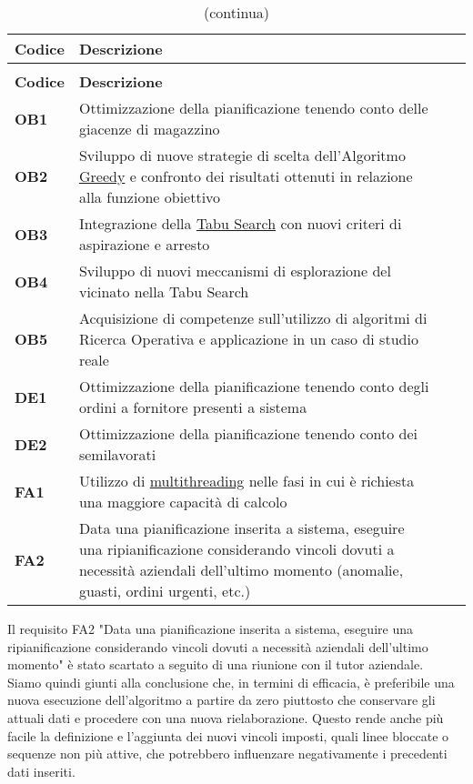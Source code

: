 \renewcommand{\arraystretch}{1.5}
\begin{longtable}{ 
		>{\centering}p{} 
		>{\raggedright}p{}
		>{\raggedright}p{} 
		>{\centering}p{}
	}
	
	\caption{Tabella degli obiettivi del piano di lavoro}\\
	\rowcolorhead
	\textbf{Codice} & \centering{}\textbf{Descrizione}
	\tabularnewline
	\endfirsthead
	\rowcolor{white}\caption[]{(continua)}\\
	\rowcolorhead
	\textbf{Codice} & \centering{}\textbf{Descrizione}
	
	\tabularnewline
	\endhead
	
	\rowcolordark \textbf{OB1} & Ottimizzazione della pianificazione tenendo conto delle giacenze di magazzino 
	\tabularnewline
	\rowcolorlight \textbf{OB2} & Sviluppo di nuove strategie di scelta dell’Algoritmo \hyperref[Greedy]{Greedy\glo} e confronto dei risultati ottenuti in relazione alla funzione obiettivo
	\tabularnewline
	\rowcolordark \textbf{OB3} & Integrazione della \hyperref[Tabu Search]{Tabu Search\glo} con nuovi criteri di aspirazione e arresto
	\tabularnewline
	\rowcolorlight \textbf{OB4} & Sviluppo di nuovi meccanismi di esplorazione del vicinato nella Tabu Search
	\tabularnewline
	\rowcolordark \textbf{OB5} & Acquisizione di competenze sull’utilizzo di algoritmi di Ricerca Operativa e applicazione in un caso di studio reale
	\tabularnewline
	\rowcolorlight \textbf{DE1} & Ottimizzazione della pianificazione tenendo conto degli ordini a fornitore presenti a sistema
	\tabularnewline
	\rowcolordark \textbf{DE2} & Ottimizzazione della pianificazione tenendo conto dei semilavorati
	\tabularnewline
	\rowcolorlight \textbf{FA1} & Utilizzo di \hyperref[Multithreading]{multithreading\glo} nelle fasi in cui è richiesta una maggiore capacità di calcolo
	\tabularnewline
	\rowcolordark \textbf{FA2} & Data una pianificazione inserita a sistema, eseguire una ripianificazione considerando vincoli dovuti a necessità aziendali dell’ultimo momento (anomalie, guasti, ordini urgenti, etc.)
	\tabularnewline
	
\end{longtable}


Il requisito FA2 "Data una pianificazione inserita a sistema, eseguire una
ripianificazione considerando vincoli dovuti a necessità aziendali
dell’ultimo momento" è stato scartato a seguito di una riunione con il tutor aziendale. \\Siamo quindi giunti alla conclusione che, in termini di efficacia, è preferibile una nuova esecuzione dell'algoritmo a partire da zero piuttosto che conservare gli attuali dati e procedere con una nuova rielaborazione. Questo rende anche più facile la definizione e l'aggiunta dei nuovi vincoli imposti, quali linee bloccate o sequenze non più attive, che potrebbero influenzare negativamente i precedenti dati inseriti.


